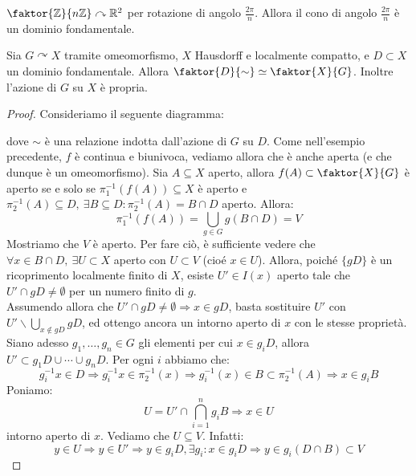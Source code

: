 \begin{ex}
$\faktor {\mathbb{Z}}{n\mathbb{Z}} \curvearrowright \mathbb{R}^2$ per rotazione di angolo $\frac{2\pi}{n}$. Allora il cono di angolo $\frac{2\pi}{n}$ è un dominio fondamentale.
\end{ex}

\begin{thm}
Sia $G \curvearrowright X$ tramite omeomorfismo, $X$ Hausdorff e localmente compatto, e $D \subset X$ un dominio fondamentale. Allora $\faktor {D}{\sim} \simeq \faktor {X}{G}$. Inoltre l'azione di $G$ su $X$ è propria.
\end{thm}
\begin{proof}
Consideriamo il seguente diagramma:
\begin{center}
\end{center}
dove $\sim$ è una relazione indotta dall'azione di $G$ su $D$. Come nell'esempio precedente, $f$ è continua e biunivoca, vediamo allora che è anche aperta (e che dunque è un omeomorfismo). Sia $A \subseteq X$ aperto, allora $f(A) \subset \faktor {X}{G}$ è aperto se e solo se $\pi _1 ^{-1} (f(A)) \subseteq X$ è aperto e $\pi _2 ^{-1} (A) \subseteq D,\ \exists B \subseteq D : \pi _2 ^{-1} (A)=B \cap D$ aperto. Allora:
$$\pi _1 ^{-1} (f(A))=\bigcup _{g \in G} g(B \cap D)=V$$
Mostriamo che $V$ è aperto. Per fare ciò, è sufficiente vedere che $\forall x \in B \cap D,\ \exists U \subset X$ aperto con $U \subset V$ (cioé $x \in U$). Allora, poiché $\{gD\}$ è un ricoprimento localmente finito di $X$, esiste $U' \in I(x)$ aperto tale che $U' \cap gD \neq \emptyset$ per un numero finito di $g$.\\
Assumendo allora che $U' \cap gD \neq \emptyset \Longrightarrow x \in gD$, basta sostituire $U'$ con $\displaystyle U' \smallsetminus \bigcup _{x \notin gD} gD$, ed ottengo ancora un intorno aperto di $x$ con le stesse proprietà. Siano adesso $g_1,\dots,g_n \in G$ gli elementi per cui $x \in g_iD$, allora $U' \subset g_1D \cup \cdots \cup g_nD$. Per ogni $i$ abbiamo che:
$$g_i^{-1}x \in D \Longrightarrow g_i^{-1}x \in \pi _2 ^{-1}(x) \Longrightarrow g_i^{-1}(x) \in B \subset \pi _2^{-1}(A) \Longrightarrow x \in g_iB$$
Poniamo:
$$U=U' \cap \bigcap _{i=1}^n g_iB \Longrightarrow  x \in U$$
intorno aperto di $x$. Vediamo che $U \subseteq V$. Infatti:
$$y \in U \Longrightarrow y \in U' \Longrightarrow y \in g_iD, \exists g_i :x \in g_iD \Longrightarrow y \in g_i(D \cap B) \subset V$$
\end{proof}
